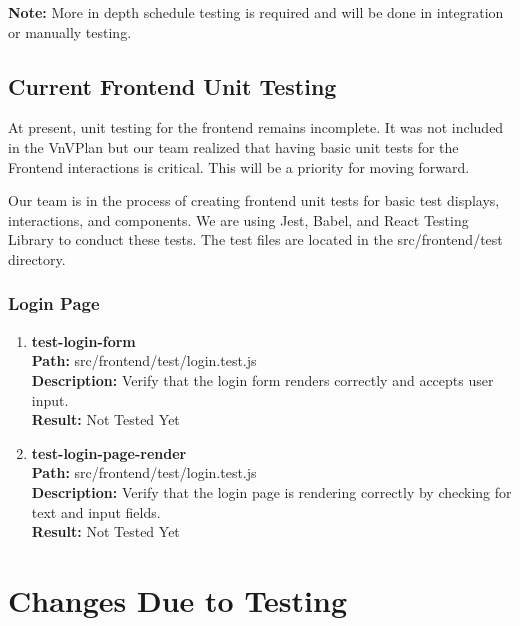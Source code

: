 \documentclass[12pt, titlepage]{article}
\begin{document}
\textbf{Note:} More in depth schedule testing is required and will be done in integration or manually testing.

\subsection{Current Frontend Unit Testing}

At present, unit testing for the frontend remains incomplete. It was not included in the VnVPlan but our team realized that having basic unit tests for the Frontend interactions is critical. This will be a priority for moving forward.

Our team is in the process of creating frontend unit tests for basic test displays, interactions, and components. We are using Jest, Babel, and React Testing Library to conduct these tests. The test files are located in the src/frontend/test directory.

\subsubsection{Login Page}

\begin{enumerate}
    \item{\textbf{test-login-form}\\}
        \textbf{Path:} src/frontend/test/login.test.js\\
        \textbf{Description:} Verify that the login form renders correctly and accepts user input.\\
        \textbf{Result:} Not Tested Yet

    \item{\textbf{test-login-page-render}\\}
        \textbf{Path:} src/frontend/test/login.test.js\\
        \textbf{Description:} Verify that the login page is rendering correctly by checking for text and input fields.\\
        \textbf{Result:} Not Tested Yet
\end{enumerate}

\section{Changes Due to Testing}

\end{document}

